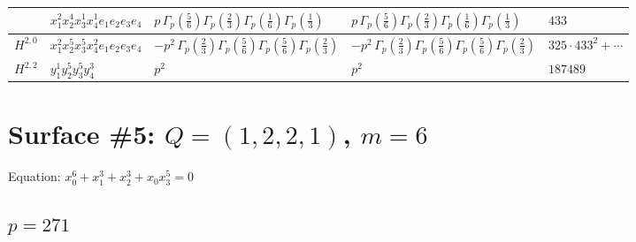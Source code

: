 \documentclass[11pt]{article}
\begin{document}
\begin{table}[ht]
{\begin{tabular}{@{}lllll@{}}
 & $x_{1}^{2} x_{2}^{4} x_{3}^{1} x_{4}^{1}  e_{1} e_{2} e_{3} e_{4}$ & $p \, \Gamma_p \left( \frac{5}{6} \right) \Gamma_p \left( \frac{2}{3} \right) \Gamma_p \left( \frac{1}{6} \right) \Gamma_p \left( \frac{1}{3} \right)$ & $p \, \Gamma_p \left( \frac{5}{6} \right) \Gamma_p \left( \frac{2}{3} \right) \Gamma_p \left( \frac{1}{6} \right) \Gamma_p \left( \frac{1}{3} \right)$ & $433$ \\
\midrule
$H^{2,0}$ & $x_{1}^{2} x_{2}^{5} x_{3}^{5} x_{4}^{2}  e_{1} e_{2} e_{3} e_{4}$ & $- p^{2} \, \Gamma_p \left( \frac{2}{3} \right) \Gamma_p \left( \frac{5}{6} \right) \Gamma_p \left( \frac{5}{6} \right) \Gamma_p \left( \frac{2}{3} \right)$ & $- p^{2} \, \Gamma_p \left( \frac{2}{3} \right) \Gamma_p \left( \frac{5}{6} \right) \Gamma_p \left( \frac{5}{6} \right) \Gamma_p \left( \frac{2}{3} \right)$ & $325{\cdot}433^{2}{+}\cdots$ \\
\midrule
$H^{2,2}$ & $y_{1}^{1} y_{2}^{5} y_{3}^{5} y_{4}^{3}$ & $p^{2} \,$ & $p^{2} \,$ & $187489$ \\
\bottomrule
\end{tabular}
}
\renewcommand{\arraystretch}{1.0}
\end{table}

\newpage

\section*{Surface \#5: $Q=(1, 2, 2, 1)$, $m=6$}

Equation: $x_0^{6} + x_1^{3} + x_2^{3} + x_0 x_3^{5} = 0$

\subsection*{$p = 271$}
\end{document}
